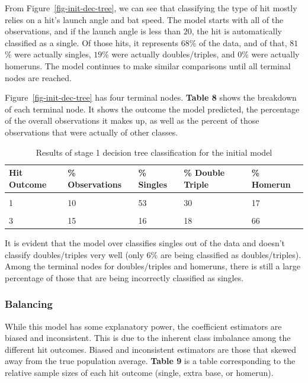 \documentclass[
  letterpaper,
  DIV=11,
  numbers=noendperiod]{scrartcl}
\begin{document}
From Figure~\ref{fig-init-dec-tree}, we can see that classifying the
type of hit mostly relies on a hit's launch angle and bat speed. The
model starts with all of the observations, and if the launch angle is
less than \(20\), the hit is automatically classified as a single. Of
those hits, it represents \(68\)\% of the data, and of that, \(81\)\%
were actually singles, \(19\)\% were actually doubles/triples, and
\(0\)\% were actually homeruns. The model continues to make similar
comparisons until all terminal nodes are reached.

Figure~\ref{fig-init-dec-tree} has four terminal nodes. \textbf{Table 8}
shows the breakdown of each terminal node. It shows the outcome the
model predicted, the percentage of the overall observations it makes up,
as well as the percent of those observations that were actually of other
classes.

\begin{table}[!h]
\centering
\caption{\label{tab:unnamed-chunk-39}Results of stage 1 decision tree classification for the initial model}
\centering
\begin{tabular}[t]{lllll}
\toprule
Hit Outcome & \% Observations & \% Singles & \% Double Triple & \% Homerun\\
\midrule
\cellcolor{gray!10}{1} & \cellcolor{gray!10}{68} & \cellcolor{gray!10}{81} & \cellcolor{gray!10}{19} & \cellcolor{gray!10}{0}\\
1 & 10 & 53 & 30 & 17\\
\cellcolor{gray!10}{2} & \cellcolor{gray!10}{6} & \cellcolor{gray!10}{28} & \cellcolor{gray!10}{44} & \cellcolor{gray!10}{28}\\
3 & 15 & 16 & 18 & 66\\
\bottomrule
\end{tabular}
\end{table}

It is evident that the model over classifies singles out of the data and
doesn't classify doubles/triples very well (only \(6\)\% are being
classified as doubles/triples). Among the terminal nodes for
doubles/triples and homeruns, there is still a large percentage of those
that are being incorrectly classified as singles.

\subsubsection{Balancing}\label{balancing}

While this model has some explanatory power, the coefficient estimators
are biased and inconsistent. This is due to the inherent class imbalance
among the different hit outcomes. Biased and inconsistent estimators are
those that skewed away from the true population average. \textbf{Table
9} is a table corresponding to the relative sample sizes of each hit
outcome (single, extra base, or homerun).
\end{document}
